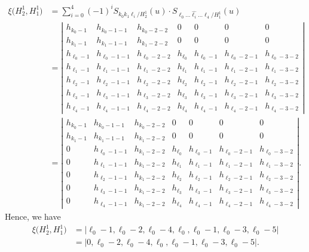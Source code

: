 \documentclass[10pt,a4paper]{amsart}
\numberwithin{equation}{section}
\begin{document}
\begin{align*}
\xi\bigl(H^{1}_{2},H^{1}_{1}\bigr)&=\sum_{i= 0}^{4}{(-1)}^{i}S_{k_0 k_1 \ell_i/H^{1}_{2}}(u)\cdot S_{\ell_0 \dots \widehat{\ell_i} \dots \ell_{4}/H^{1}_{1}}(u)\nonumber\\
&=\left|\begin{array}{ccc|cccc}
h_{k_0-1} & h_{k_0-1-1} &h_{k_0-2-2} & 0 & 0 & 0 &0\\
h_{k_1-1} & h_{k_1-1-1} &h_{k_1-2-2} & 0 & 0 & 0 &0\\
h_{\ell_0-1} & h_{\ell_0-1-1} &h_{\ell_0-2-2} & h_{\ell_{0}} &h_{\ell_{0}-1} & h_{\ell_{0}-2-1} & h_{\ell_{0}-3-2} \\\hline
h_{\ell_1-1} & h_{\ell_1-1-1} &h_{\ell_1-2-2} & h_{\ell_{1}} &h_{\ell_{1}-1}& h_{\ell_{1}-2-1} & h_{\ell_{1}-3-2}\\
h_{\ell_2-1} & h_{\ell_2-1-1} &h_{\ell_2-2-2} & h_{\ell_{2}} &h_{\ell_{2}-1}& h_{\ell_{2}-2-1} & h_{\ell_{2}-3-2}\\
h_{\ell_3-1} & h_{\ell_3-1-1} &h_{\ell_3-2-2} & h_{\ell_{3}} &h_{\ell_{3}-1}& h_{\ell_{3}-2-1} & h_{\ell_{3}-3-2}\\
h_{\ell_4-1} & h_{\ell_4-1-1} &h_{\ell_4-2-2} & h_{\ell_{4}} &h_{\ell_{4}-1}& h_{\ell_{4}-2-1} & h_{\ell_{4}-3-2}
\end{array}\right|\nonumber\\
&=\left|\begin{array}{ccc|cccc}
h_{k_0-1} & h_{k_0-1-1} &h_{k_0-2-2} & 0 & 0 & 0 &0\\
h_{k_1-1} & h_{k_1-1-1} &h_{k_1-2-2} & 0 & 0 & 0 &0\\
0 & h_{\ell_0-1-1} & h_{k_1-2-2} & h_{\ell_{0}} &h_{\ell_{0}-1} & h_{\ell_{0}-2-1} & h_{\ell_{0}-3-2} \\\hline
0 & h_{\ell_1-1-1} & h_{k_1-2-2} & h_{\ell_{1}} &h_{\ell_{1}-1}& h_{\ell_{1}-2-1} & h_{\ell_{1}-3-2}\\
0 & h_{\ell_2-1-1} & h_{k_1-2-2} & h_{\ell_{2}} &h_{\ell_{2}-1}& h_{\ell_{2}-2-1} & h_{\ell_{2}-3-2}\\
0 & h_{\ell_3-1-1} & h_{k_1-2-2} & h_{\ell_{3}} &h_{\ell_{3}-1}& h_{\ell_{3}-2-1} & h_{\ell_{3}-3-2}\\
0 & h_{\ell_4-1-1} & h_{k_1-2-2} & h_{\ell_{4}} &h_{\ell_{4}-1}& h_{\ell_{4}-2-1} & h_{\ell_{4}-3-2}
\end{array}\right|.\nonumber
\end{align*}
Hence, we have
\begin{align*}
\xi\bigl(H^{1}_{2},H^{1}_{1}\bigr)&=|\ell_{0}-1,\ell_{0}-2,\ell_{0}-4,\ell_{0},\ell_{0}-1,\ell_{0}-3,\ell_{0}-5|\\
&=|0,{\ell_{0}-2},{\ell_0-4},\ell_{0},{\ell_{0}-1},\ell_{0}-3,\ell_{0}-5|.
\end{align*}
\end{document}
